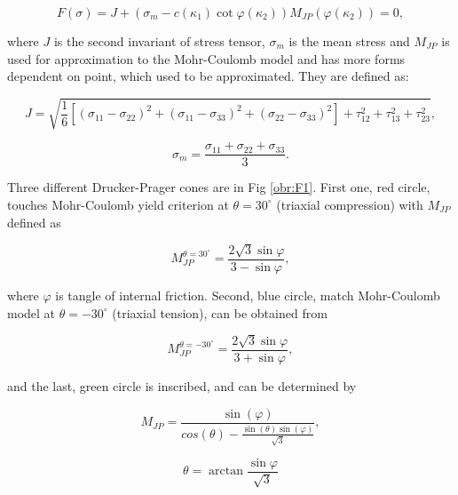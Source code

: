 \begin{equation}\label{eq:f_yc}
	F(\sigma) = J + (\sigma_m-c(\kappa_{1}) \cot \varphi(\kappa_{2}) )M_{JP}(\varphi(\kappa_{2})) = 0,
\end{equation}

where $J$ is the second invariant of stress tensor, $\sigma_m$ is the mean stress and $M_{JP}$ is used for approximation to the Mohr-Coulomb model and has more forms dependent on point, which used to be approximated. They are defined as:

\begin{equation}\label{eq:f_J_sigM}
	J = \sqrt{\dfrac{1}{6} \left[(\sigma_{11}-\sigma_{22})^{2} + (\sigma_{11}-\sigma_{33})^{2} + (\sigma_{22}-\sigma_{33})^{2}\right] + \tau_{12}^{2} + \tau_{13}^{2}+ \tau_{23}^{2}},
\end{equation}


\begin{equation}\label{eq:f_sigM}
	\sigma_m = \dfrac{\sigma_{11} + \sigma_{22} + \sigma_{33}}{3}.
\end{equation}

Three different Drucker-Prager cones are in Fig \ref{obr:F1}. First one, red circle, touches Mohr-Coulomb yield criterion at $\theta = 30^\circ$ (triaxial compression) with $M_{JP}$ defined as

\begin{equation}\label{eq:f_Mjp_30}
	M_{JP}^{\theta=30^\circ} = \dfrac{2\sqrt{3}\sin\varphi}{3-\sin \varphi},
\end{equation}

where $\varphi$ is tangle of internal friction. Second, blue circle, match Mohr-Coulomb model at  $\theta = -30^\circ$ (triaxial tension), can be obtained from

\begin{equation}\label{eq:f_Mjp_-30}
	M_{JP}^{\theta=-30^\circ} = \dfrac{2\sqrt{3}\sin\varphi}{3+\sin \varphi},
\end{equation}

and the last, green circle is inscribed, and can be determined by

\begin{equation}\label{eq:f_Mjp_i}
	M_{JP} = \dfrac{\sin(\varphi)}{cos(\theta)-\frac{\sin(\theta)\sin(\varphi)}{\sqrt{3}}},
\end{equation}

\begin{equation}\label{eq:f_theta}
	\theta = \arctan{\frac{\sin{\varphi}}{\sqrt{3}}}
\end{equation}

